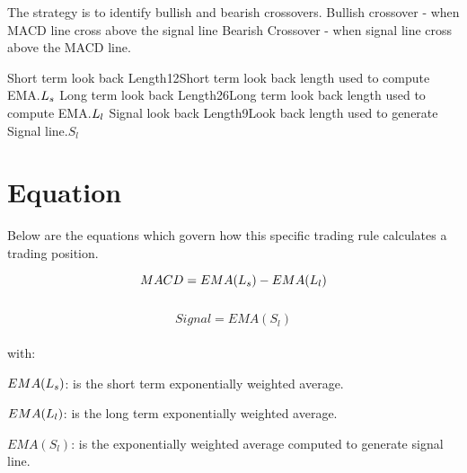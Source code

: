 \documentclass{article}
\begin{document}
\logo
{} %
\tblofcontents


\howtotrade
{The strategy is to identify bullish and bearish crossovers.
Bullish crossover - when MACD line cross above the signal line
Bearish Crossover - when signal line cross above the MACD line.
}

{Short term look back Length}{12}{Short term look back length used to compute EMA.}{$L_{s}$}
{Long term look back Length}{26}{Long term look back length used to compute EMA.}{$L_{l}$}
{Signal look back Length}{9}{Look back length used to generate Signal line.}{$S_{l}$}
\stoptable

\newpage
\section{Equation}
Below are the equations which govern how this specific trading rule calculates a trading position.

\begin{equation}
MACD = EMA(L_{s}) - EMA(L_{l})
\end{equation}
\\
\begin{equation}
Signal = EMA(S_{l})
\end{equation}
\\ %
with:

$EMA(L_{s})$: is the short term exponentially weighted average.

$EMA(L_{l})$: is the long term exponentially weighted average.

$EMA(S_{l})$: is the exponentially weighted average computed to generate signal line.


\keyterms
\furtherlinks %
\end{document}
